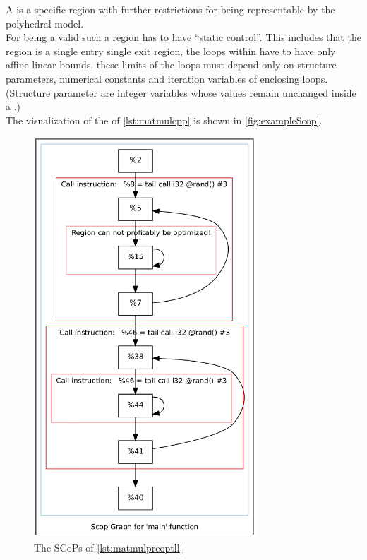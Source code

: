 A \scop is a specific region with further restrictions for being representable by the polyhedral model.\\
For being a valid \scop such a region has to have \enquote{static control}.
This includes that the region is a single entry single exit region, the loops within have to have only affine linear bounds, these limits of the loops must depend only on structure parameters, numerical constants and iteration variables of enclosing loops.
(Structure parameter are integer variables whose values remain unchanged inside a \scop.) \cite{GanserIterativeSchedule, ScopDetection.cpp}\\
The visualization of the \scops of \autoref{lst:matmulcpp} is shown in \autoref{fig:exampleScop}.
\begin{figure}[!ht]
    \centering
    \caption{The SCoPs of \autoref{lst:matmulpreoptll}}
    \label{fig:exampleScop}
    \includegraphics[height=15cm]{gfx/matmulScops.png}
\end{figure}
